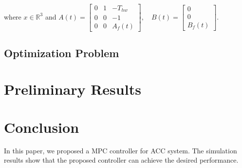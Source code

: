 \documentclass{article}
\numberwithin{equation}{section}
\begin{document}
\noindent where $x \in \mathbb{R}^3$ and $A(t)=\left[\begin{array}{ccc}
            0 & 1 & -T_{h w} \\
            0 & 0 & -1       \\
            0 & 0 & A_{f}(t)
        \end{array}\right], \quad B(t)=\left[\begin{array}{c}
            0 \\
            0 \\
            B_{f}(t)
        \end{array}\right]$.
\subsection{Optimization Problem}

\section{Preliminary Results}
\section{Conclusion}

In this paper, we proposed a MPC controller for ACC system. The simulation
results show that the proposed controller can achieve the desired performance.



\end{document}
